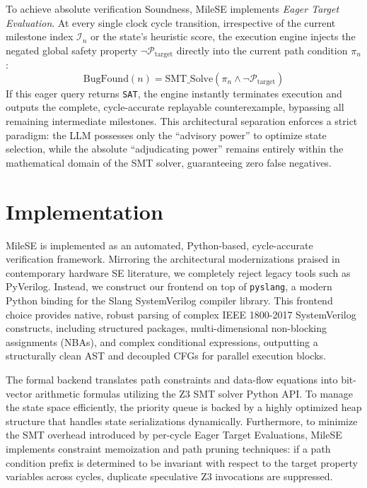 \documentclass[conference]{IEEEtran}
\begin{document}
To achieve absolute verification Soundness, MileSE implements \textit{Eager Target Evaluation}. At every single clock cycle transition, irrespective of the current milestone index $\mathcal{I}_n$ or the state's heuristic score, the execution engine injects the negated global safety property $\neg \mathcal{P}_{\text{target}}$ directly into the current path condition $\pi_n$:
\begin{equation}
    \text{BugFound}(n) = \text{SMT\_Solve}\left(\pi_n \wedge \neg \mathcal{P}_{\text{target}}\right)
\end{equation}
If this eager query returns \texttt{SAT}, the engine instantly terminates execution and outputs the complete, cycle-accurate replayable counterexample, bypassing all remaining intermediate milestones. This architectural separation enforces a strict paradigm: the LLM possesses only the ``advisory power'' to optimize state selection, while the absolute ``adjudicating power'' remains entirely within the mathematical domain of the SMT solver, guaranteeing zero false negatives.

\section{Implementation}
\label{sec:implementation}
MileSE is implemented as an automated, Python-based, cycle-accurate verification framework. Mirroring the architectural modernizations praised in contemporary hardware SE literature, we completely reject legacy tools such as PyVerilog. Instead, we construct our frontend on top of \texttt{pyslang}, a modern Python binding for the Slang SystemVerilog compiler library. This frontend choice provides native, robust parsing of complex IEEE 1800-2017 SystemVerilog constructs, including structured packages, multi-dimensional non-blocking assignments (NBAs), and complex conditional expressions, outputting a structurally clean AST and decoupled CFGs for parallel execution blocks.

The formal backend translates path constraints and data-flow equations into bit-vector arithmetic formulas utilizing the Z3 SMT solver Python API. To manage the state space efficiently, the priority queue is backed by a highly optimized heap structure that handles state serializations dynamically. Furthermore, to minimize the SMT overhead introduced by per-cycle Eager Target Evaluations, MileSE implements constraint memoization and path pruning techniques: if a path condition prefix is determined to be invariant with respect to the target property variables across cycles, duplicate speculative Z3 invocations are suppressed.
\end{document}
